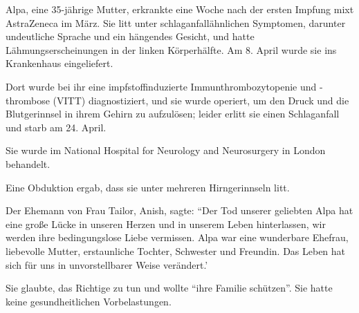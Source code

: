 Alpa, eine 35-jährige Mutter, erkrankte eine Woche nach der ersten Impfung mixt
AstraZeneca im März. Sie litt unter schlaganfallähnlichen Symptomen, darunter
undeutliche Sprache und ein hängendes Gesicht, und hatte Lähmungserscheinungen
in der linken Körperhälfte. Am 8. April wurde sie ins Krankenhaus eingeliefert.

Dort wurde bei ihr eine impfstoffinduzierte Immunthrombozytopenie und -thrombose
(VITT) diagnostiziert, und sie wurde operiert, um den Druck und die
Blutgerinnsel in ihrem Gehirn zu aufzulösen; leider erlitt sie einen
Schlaganfall und starb am 24. April.

Sie wurde im National Hospital for Neurology and Neurosurgery in London
behandelt.

Eine Obduktion ergab, dass sie unter mehreren Hirngerinnseln litt.

Der Ehemann von Frau Tailor, Anish, sagte: ``Der Tod unserer geliebten Alpa hat
eine große Lücke in unseren Herzen und in unserem Leben hinterlassen, wir werden
ihre bedingungslose Liebe vermissen. Alpa war eine wunderbare Ehefrau,
liebevolle Mutter, erstaunliche Tochter, Schwester und Freundin. Das Leben hat
sich für uns in unvorstellbarer Weise verändert.'

Sie glaubte, das Richtige zu tun und wollte ``ihre Familie schützen''. Sie hatte
keine gesundheitlichen Vorbelastungen.
